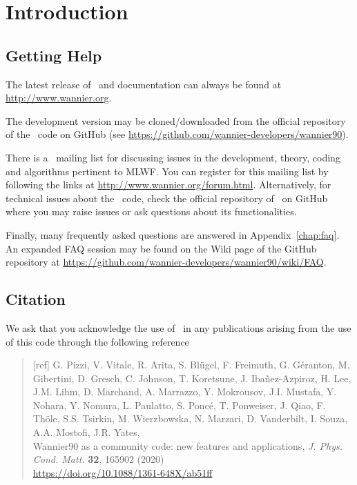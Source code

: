 \chapter*{Introduction}
\section*{Getting Help}
The latest release of \wannier\ and documentation can always
be found at \url{http://www.wannier.org}.

The development version may be cloned/downloaded from the
official repository of the \wannier\ code on GitHub 
(see \url{https://github.com/wannier-developers/wannier90}).

There is a \wannier\ mailing list for discussing issues in the
development, theory, coding and algorithms pertinent to MLWF.
You can register for this mailing list by following the links at
\url{http://www.wannier.org/forum.html}.
Alternatively, for technical issues about the \wannier\ code, 
check the official repository of \wannier\ on GitHub 
where you may raise issues or ask questions about its
functionalities.

Finally, many frequently asked questions are answered in
Appendix~\ref{chap:faq}. An expanded FAQ session may be
found on the Wiki page of the GitHub repository at 
\url{https://github.com/wannier-developers/wannier90/wiki/FAQ}. 

\section*{Citation}
We ask that you acknowledge the use of \wannier\ in any publications
arising from the use of this code through the following reference
\begin{quote}
  [ref] G. Pizzi, V. Vitale, R. Arita, S. Bl\"ugel, F. Freimuth, G. G\'eranton, 
  M. Gibertini, D. Gresch, C. Johnson, T. Koretsune, J. Iba\~nez-Azpiroz, 
  H. Lee, J.M. Lihm, D. Marchand, A. Marrazzo, Y. Mokrousov, J.I. Mustafa, 
  Y. Nohara, Y. Nomura, L. Paulatto, S. Ponc\'e, T. Ponweiser, J. Qiao, 
  F. Th\"ole, S.S. Tsirkin, M. Wierzbowska, N. Marzari, D. Vanderbilt, 
  I. Souza, A.A. Mostofi, J.R. Yates,\\
  Wannier90 as a community code: new features and 
    applications, \emph{J. Phys. Cond. Matt.} {\bf 32}, 165902 (2020)\\
    \url{https://doi.org/10.1088/1361-648X/ab51ff}
  \end{quote}
  

